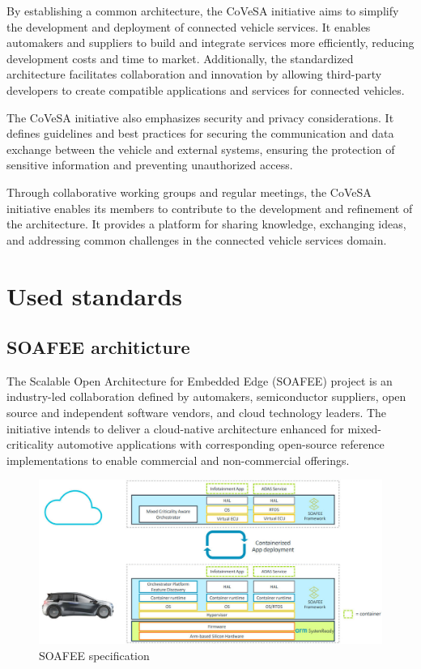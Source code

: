 \documentclass[
12pt,
oneside, 
onehalfspacing, 
nolistspacing, 
parskip, 
chapterinoneline, 
]{AASTCOMPUTER}
\begin{document}
By establishing a common architecture, the CoVeSA initiative aims to simplify the development and deployment of connected vehicle services. It enables automakers and suppliers to build and integrate services more efficiently, reducing development costs and time to market. Additionally, the standardized architecture facilitates collaboration and innovation by allowing third-party developers to create compatible applications and services for connected vehicles.

The CoVeSA initiative also emphasizes security and privacy considerations. It defines guidelines and best practices for securing the communication and data exchange between the vehicle and external systems, ensuring the protection of sensitive information and preventing unauthorized access.

Through collaborative working groups and regular meetings, the CoVeSA initiative enables its members to contribute to the development and refinement of the architecture. It provides a platform for sharing knowledge, exchanging ideas, and addressing common challenges in the connected vehicle services domain.
\newpage
\section{Used standards}
\subsection{SOAFEE architicture}
The Scalable Open Architecture for Embedded Edge (SOAFEE)\cite{SOAFEE_ARCH} project is an industry-led collaboration defined by automakers, semiconductor suppliers, open source and independent software vendors, and cloud technology leaders. The initiative intends to deliver a cloud-native architecture enhanced for mixed-criticality automotive applications with corresponding open-source reference implementations to enable commercial and non-commercial offerings.

\begin{figure}[!ht]
	\centering
	\includegraphics[scale=1.5]{Figures/Architicture/SOAPHEE.jpg}
  	\caption{SOAFEE specification}
  	\label{fig:SOAFEE specification}
\end{figure}
\end{document}
